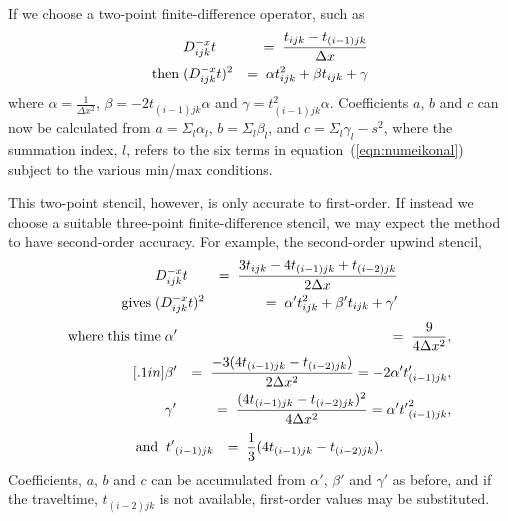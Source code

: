 \par
If we choose a two-point finite-difference operator, such as
\begin{eqnarray}
& D_{ijk}^{-x} t & = \;
\frac{t_{ijk}-t_{(i-1)jk}}{\Delta x} \\ 
{\rm then} \;  &
(D_{ijk}^{-x} t)^2 & = \;
\alpha t_{ijk}^2 + \beta t_{ijk} + \gamma
\end{eqnarray} 
where 
$\alpha = \frac{1}{\Delta x^2}$, 
$\beta  = -2 t_{(i-1)jk} \alpha$ and  
$\gamma = t_{(i-1)jk}^2 \alpha$.
Coefficients $a$, $b$ and $c$ can now be calculated from 
$a = \Sigma_l \alpha_l$,
$b = \Sigma_l \beta_l$, and 
$c = \Sigma_l \gamma_l - s^2$,
where the summation index, $l$, refers to the six terms in
equation~(\ref{eqn:numeikonal}) subject to the various min/max 
conditions. 

\par
This two-point stencil, however, is only accurate to first-order.  
If instead we choose a suitable three-point finite-difference
stencil, we may expect the method to have second-order accuracy. For
example, the second-order upwind stencil,
\begin{eqnarray}
& D_{ijk}^{-x} t & = \; \frac{3t_{ijk}-4t_{(i-1)jk} +
t_{(i-2)jk}}{2 \Delta x} \\ {\rm gives} \;
& (D_{ijk}^{-x} t)^2 & = \;
\alpha' t_{ijk}^2 + \beta' t_{ijk} + \gamma'
\end{eqnarray}
\begin{eqnarray*}
{\rm where \; this \; time \;} &
\alpha' & = \; \frac{9}{4 \Delta x^2}, \\ [.1in] & 
\beta'  & = \; \frac{-3 (4 t_{(i-1)jk}-t_{(i-2)jk})}{2 \Delta x^2}
= -2 \alpha' t'_{(i-1)jk}, \\ &
\gamma' & = \; \frac{(4 t_{(i-1)jk}-t_{(i-2)jk})^2}{4 \Delta x^2} 
= \alpha' {t'}_{(i-1)jk}^2,
\end{eqnarray*}
\begin{eqnarray*}
{\rm and} \; \; &
{t'}_{(i-1)jk} & = \; \frac{1}{3}(4 t_{(i-1)jk}-t_{(i-2)jk}).
\end{eqnarray*}
Coefficients, $a$, $b$ and $c$ can be accumulated from $\alpha'$,
$\beta'$ and $\gamma'$ as before, and if the traveltime, $t_{(i-2)jk}$ 
is not available, first-order values may be substituted.

